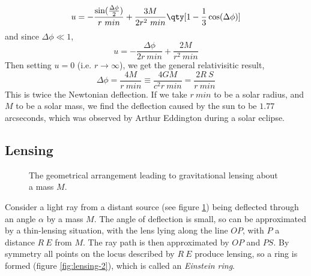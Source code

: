 \begin{equation}
  \label{eq:177}
    u = -\frac{\sin(\frac{\Delta \phi}{2})}{r~{min}} + \frac{3 M}{2 r^2~{min}} \qty[1-\frac{1}{3} \cos(\Delta \phi) ]
\end{equation}
and since $\Delta \phi \ll 1$,
\begin{equation}
  \label{eq:178}
  u = - \frac{\Delta \phi}{2 r~{min}} + \frac{2M}{r^2~{min}}
\end{equation}
Then setting $u=0$ (i.e. $r \to \infty$), we get the general relativisitic result,
\begin{equation}
  \label{eq:179}
  \Delta \phi = \frac{4 M}{r~{min}} \equiv \frac{4 GM}{c^2 r~{min}} = \frac{2 R~S}{r~{min}}
\end{equation}
This is twice the Newtonian deflection. If we take $r~{min}$ to be a
solar radius, and $M$ to be a solar mass, we find the deflection
caused by the sun to be $1.77$ arcseconds, which was observed by
Arthur Eddington during a solar eclipse.

\subsection{Lensing}
\label{sec:lensing}

\begin{figure}[b]
  \centering
  \caption{The geometrical arrangement leading to gravitational lensing about a mass $M$.}
  \label{fig:lensing}
\end{figure}

Consider a light ray from a distant source (see figure
\ref{fig:lensing}) being deflected through an angle $\alpha$ by a mass
$M$. The angle of deflection is small, so can be approximated by a
thin-lensing situation, with the lens lying along the line $OP$, with
$P$ a distance $R~E$ from $M$. The ray path is then approximated by
$OP$ and $PS$. By symmetry all points on the locus described by $R~E$
produce lensing, so a ring is formed (figure \ref{fig:lensing-2}),
which is called an \emph{Einstein ring}.

